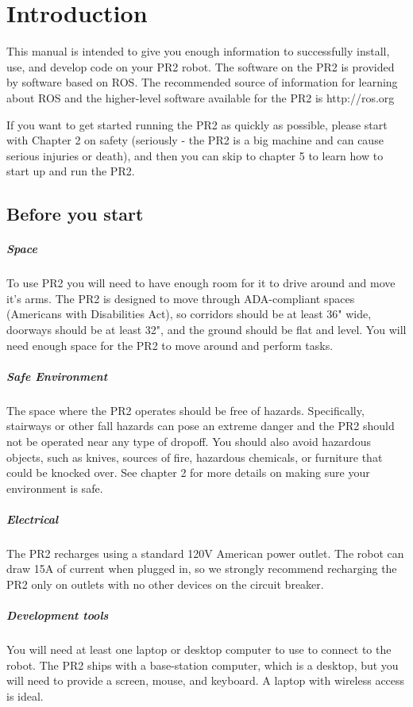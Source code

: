 \chapter {Introduction}
This manual is intended to give you enough information to successfully install, use, and develop code on your PR2 robot.  The software on the PR2 is provided by software based on ROS.  The recommended source of information for learning about ROS and the higher-level software available for the PR2 is http://ros.org

If you want to get started running the PR2 as quickly as possible, please start with Chapter 2 on safety (seriously - the PR2 is a big machine and can cause serious injuries or death), and then you can skip to chapter 5 to learn how to start up and run the PR2.

\section{Before you start}
\paragraph{Space} To use PR2 you will need to have enough room for it to drive around and move it's arms.  The PR2 is designed to move through ADA-compliant spaces (Americans with Disabilities Act), so corridors should be at least 36" wide, doorways should be at least 32", and the ground should be flat and level.  You will need enough space for the PR2 to move around and perform tasks.
\paragraph{Safe Environment} The space where the PR2 operates should be free of hazards.  Specifically, stairways or other fall hazards can pose an extreme danger and the PR2 should not be operated near any type of dropoff.  You should also avoid hazardous objects, such as knives, sources of fire, hazardous chemicals, or furniture that could be knocked over.  See chapter 2 for more details on making sure your environment is safe.
\paragraph{Electrical} The PR2 recharges using a standard 120V American power outlet.  The robot can draw 15A of current when plugged in, so we strongly recommend recharging the PR2 only on outlets with no other devices on the circuit breaker.
\paragraph{Development tools}
You will need at least one laptop or desktop computer to use to connect to the robot.  The PR2 ships with a base-station computer, which is a desktop, but you will need to provide a screen, mouse, and keyboard.  A laptop with wireless access is ideal.
